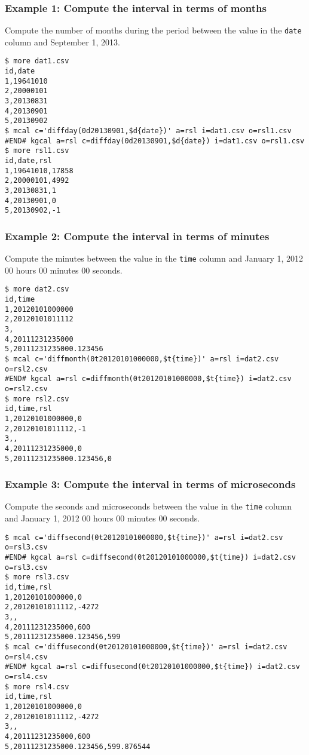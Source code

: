 \subsubsection*{Example 1: Compute the interval in terms of months}

Compute the number of months during the period between the value in the \verb|date| column and September 1, 2013.


\begin{Verbatim}[baselinestretch=0.7,frame=single]
$ more dat1.csv
id,date
1,19641010
2,20000101
3,20130831
4,20130901
5,20130902
$ mcal c='diffday(0d20130901,$d{date})' a=rsl i=dat1.csv o=rsl1.csv
#END# kgcal a=rsl c=diffday(0d20130901,$d{date}) i=dat1.csv o=rsl1.csv
$ more rsl1.csv
id,date,rsl
1,19641010,17858
2,20000101,4992
3,20130831,1
4,20130901,0
5,20130902,-1
\end{Verbatim}
\subsubsection*{Example 2: Compute the interval in terms of minutes}

Compute the minutes between the value in the \verb|time| column and January 1, 2012 00 hours 00 minutes 00 seconds.


\begin{Verbatim}[baselinestretch=0.7,frame=single]
$ more dat2.csv
id,time
1,20120101000000
2,20120101011112
3,
4,20111231235000
5,20111231235000.123456
$ mcal c='diffmonth(0t20120101000000,$t{time})' a=rsl i=dat2.csv o=rsl2.csv
#END# kgcal a=rsl c=diffmonth(0t20120101000000,$t{time}) i=dat2.csv o=rsl2.csv
$ more rsl2.csv
id,time,rsl
1,20120101000000,0
2,20120101011112,-1
3,,
4,20111231235000,0
5,20111231235000.123456,0
\end{Verbatim}
\subsubsection*{Example 3: Compute the interval in terms of microseconds}

Compute the seconds and microseconds between the value in the \verb|time| column and January 1, 2012 00 hours 00 minutes 00 seconds.


\begin{Verbatim}[baselinestretch=0.7,frame=single]
$ mcal c='diffsecond(0t20120101000000,$t{time})' a=rsl i=dat2.csv o=rsl3.csv
#END# kgcal a=rsl c=diffsecond(0t20120101000000,$t{time}) i=dat2.csv o=rsl3.csv
$ more rsl3.csv
id,time,rsl
1,20120101000000,0
2,20120101011112,-4272
3,,
4,20111231235000,600
5,20111231235000.123456,599
$ mcal c='diffusecond(0t20120101000000,$t{time})' a=rsl i=dat2.csv o=rsl4.csv
#END# kgcal a=rsl c=diffusecond(0t20120101000000,$t{time}) i=dat2.csv o=rsl4.csv
$ more rsl4.csv
id,time,rsl
1,20120101000000,0
2,20120101011112,-4272
3,,
4,20111231235000,600
5,20111231235000.123456,599.876544
\end{Verbatim}
